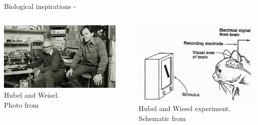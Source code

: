 \begin{frame}[t,allowframebreaks]{Biological inspirations - }
    \begin{columns}
        \begin{column}{0.55\textwidth}
            \begin{center}
            \includegraphics[width=0.9\textwidth]
                {./images/people/hubel_and_weisel.png}\\
            {\scriptsize 
            Hubel and Weisel.\\
            \color{col:attribution} 
            Photo from \cite{HarvardBrainTour:HubelAndWiesel}}\\
            \end{center}
        \end{column}
        \begin{column}{0.40\textwidth}
            \begin{center}
            \includegraphics[width=1.0\textwidth]
                {./images/biological_inspirations/hubel_wiesel_experiment.png}\\
            {\scriptsize 
            Hubel and Wiesel experiment.\\
            \color{col:attribution} 
            Schematic from \cite{GoodPsychology:HubelAndWiesel}}\\
            \end{center}
        \end{column}
    \end{columns}


\end{frame}
